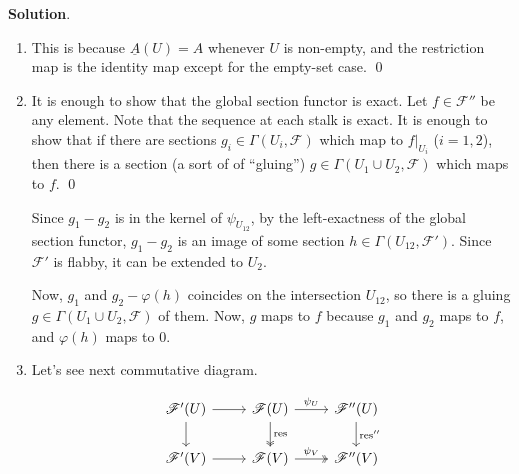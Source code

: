 \documentclass{article}
\theoremstyle{plain}
\theoremstyle{definition}
\DeclareMathOperator{\res}{res}
\begin{document}
\begin{tcolorbox}
    \textbf{Solution}.
    \begin{enumerate}
        \item This is because $\underline{A}(U) = A$ whenever $U$ is non-empty, and the restriction map is the identity map except for the empty-set case. \qed
        
        \item It is enough to show that the global section functor is exact. Let $f \in \mathscr{F}''$ be any element. Note that the sequence at each stalk is exact. It is enough to show that if there are sections $g_i \in \Gamma(U_i, \mathscr{F})$ which map to $f|_{U_i}$ ($i = 1,2$), then there is a section (a sort of of ``gluing'') $g \in \Gamma(U_1 \cup U_2, \mathscr{F})$ which maps to $f$. \qed
        
        Since $g_1 - g_2$ is in the kernel of $\psi_{U_{12}}$, by the left-exactness of the global section functor, $g_1 - g_2$ is an image of some section $h \in \Gamma(U_{12}, \mathscr{F}')$. Since $\mathscr{F}'$ is flabby, it can be extended to $U_2$.

        Now, $g_1$ and $g_2 - \varphi(h)$ coincides on the intersection $U_{12}$, so there is a gluing $g \in \Gamma(U_1 \cup U_2, \mathscr{F})$ of them. Now, $g$ maps to $f$ because $g_1$ and $g_2$ maps to $f$, and $\varphi(h)$ maps to $0$.

        \item Let's see next commutative diagram.
        
        \[\begin{tikzcd}
            {\mathscr{F}'(U)} & {\mathscr{F}(U)} & {\mathscr{F}''(U)} \\
            {\mathscr{F}'(V)} & {\mathscr{F}(V)} & {\mathscr{F}''(V)}
            \arrow[from=1-1, to=1-2]
            \arrow["{\psi_U}", from=1-2, to=1-3]
            \arrow[from=1-1, to=2-1]
            \arrow["\res", two heads, from=1-2, to=2-2]
            \arrow["{\res''}", from=1-3, to=2-3]
            \arrow[from=2-1, to=2-2]
            \arrow["{\psi_V}", two heads, from=2-2, to=2-3]
        \end{tikzcd}\]


\end{enumerate}
\end{tcolorbox}
\end{document}
